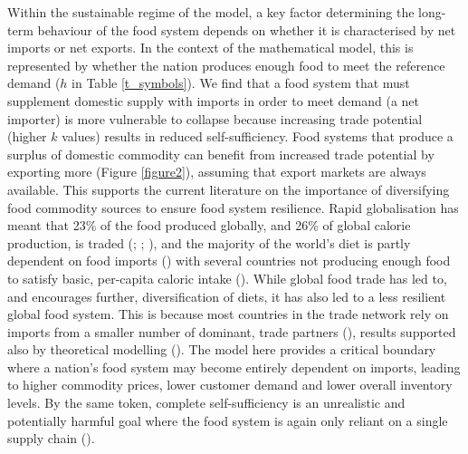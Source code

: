 \documentclass[12pt]{article}
\begin{document}
Within the sustainable regime of the model, a key factor determining the long-term behaviour of the food system depends on whether it is characterised by net imports or net exports. In the context of the mathematical model, this is represented by whether the nation produces enough food to meet the reference demand ($h$ in Table \ref{t_symbols}). We find that a food system that must supplement domestic supply with imports in order to meet demand (a net importer) is more vulnerable to collapse because increasing trade potential (higher $k$ values) results in reduced self-sufficiency. Food systems that produce a surplus of domestic commodity can benefit from increased trade potential by exporting more (Figure \ref{figure2}), assuming that export markets are always available. This supports the current literature on the importance of diversifying food commodity sources to ensure food system resilience. Rapid globalisation has meant that 23\% of the food produced globally, and 26\% of global calorie production, is traded (\cite{dodorico2014}; \cite{tu2019}; \cite{poppy2019}), and the majority of the world's diet is partly dependent on food imports (\cite{kummu2020}) with several countries not producing enough food to satisfy basic, per-capita caloric intake (\cite{dodorico2014}). While global food trade has led to, and encourages further, diversification of diets, it has also led to a less resilient global food system. This is because most countries in the trade network rely on imports from a smaller number of dominant, trade partners (\cite{kummu2020}), results supported also by theoretical modelling (\cite{tu2019}). The model here provides a critical boundary where a nation's food system may become entirely dependent on imports, leading to higher commodity prices, lower customer demand and lower overall inventory levels. By the same token, complete self-sufficiency is an unrealistic and potentially harmful goal where the food system is again only reliant on a single supply chain (\cite{helm2017}).
\end{document}
